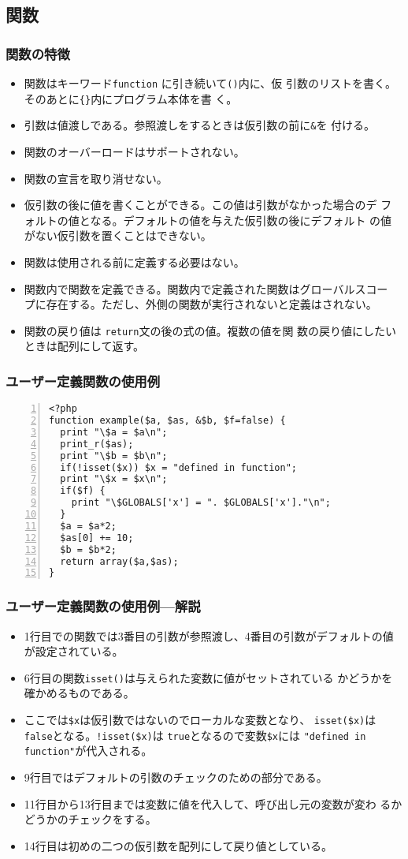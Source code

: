 \subsection{関数}
\begin{frame}[containsverbatim]
\frametitle{関数の特徴}
\begin{itemize}
 \item 関数はキーワード\texttt{function} に引き続いて\texttt{()}内に、仮
       引数のリストを書く。そのあとに\texttt{\{\}}内にプログラム本体を書
       く。
 \item 引数は値渡しである。参照渡しをするときは仮引数の前に\texttt{\&}を
       付ける。
 \item 関数のオーバーロードはサポートされない。
 \item 関数の宣言を取り消せない。
 \item 仮引数の後に値を書くことができる。この値は引数がなかった場合のデ
       フォルトの値となる。デフォルトの値を与えた仮引数の後にデフォルト
       の値がない仮引数を置くことはできない。
 \item 関数は使用される前に定義する必要はない。
 \item 関数内で関数を定義できる。関数内で定義された関数はグローバルスコー
       プに存在する。ただし、外側の関数が実行されないと定義はされない。
 \item 関数の戻り値は \texttt{return}文の後の式の値。複数の値を関
       数の戻り値にしたいときは配列にして返す。
\end{itemize}
\end{frame}
\begin{frame}[containsverbatim]
\frametitle{ユーザー定義関数の使用例}
\begin{Verbatim}[fontsize=\small,numbers=left]
<?php
function example($a, $as, &$b, $f=false) {
  print "\$a = $a\n";
  print_r($as);
  print "\$b = $b\n";
  if(!isset($x)) $x = "defined in function";
  print "\$x = $x\n";
  if($f) {
    print "\$GLOBALS['x'] = ". $GLOBALS['x']."\n";
  }
  $a = $a*2;
  $as[0] += 10;
  $b = $b*2;
  return array($a,$as);
}
\end{Verbatim}
\end{frame}
\begin{frame}[containsverbatim]
\frametitle{ユーザー定義関数の使用例---解説}
\begin{itemize}
 \item 1行目での関数では3番目の引数が参照渡し、4番目の引数がデフォルトの値
       が設定されている。
 \item 6行目の関数\texttt{isset()}は与えられた変数に値がセットされている
       かどうかを確かめるものである。
 \item ここでは\verb+$x+は仮引数ではないのでローカルな変数となり、
       \verb+isset($x)+は\texttt{false}となる。\verb+!isset($x)+は
       \texttt{true}となるので変数\verb+$x+には
       \verb+"defined in function"+が代入される。
 \item 9行目ではデフォルトの引数のチェックのための部分である。
 \item 11行目から13行目までは変数に値を代入して、呼び出し元の変数が変わ
       るかどうかのチェックをする。
 \item 14行目は初めの二つの仮引数を配列にして戻り値としている。
\end{itemize}
\end{frame}

